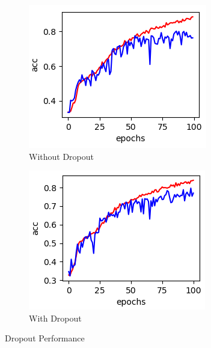 \documentclass[../main.tex]{subfiles}
\begin{document}
\begin{figure}[h!]
  \centering
  \begin{subfigure}[b]{0.35\linewidth}
    \includegraphics[width=\linewidth]{without-dropout.png}
    \caption{Without Dropout}
  \end{subfigure}
  \begin{subfigure}[b]{0.35\linewidth}
    \includegraphics[width=\linewidth]{withdo.png}
    \caption{With Dropout}
  \end{subfigure}
  \caption{Dropout Performance}
  \label{fig:dropout-performance}
\end{figure}
\end{document}
